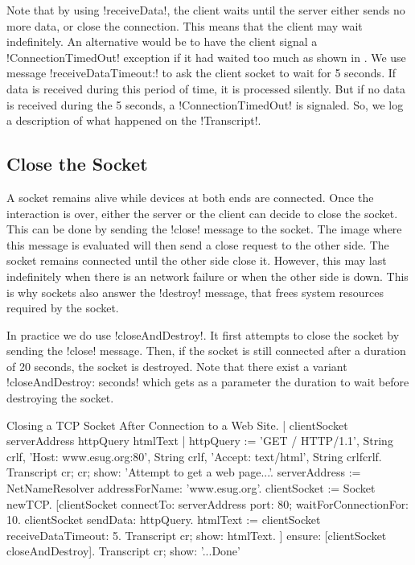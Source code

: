 \documentclass[a4paper,10pt,twoside]{book}
\begin{document}
Note that by using  \ct!receiveData!, the client waits until the server either sends no more data, or close the connection.
This means that the client may wait indefinitely.
An alternative would be to have the client signal a \ct!ConnectionTimedOut! exception if it had waited too much as shown in .
We use message \ct!receiveDataTimeout:! to ask the client socket to wait for 5 seconds.
If data is received during this period of time, it is processed silently.
But if no data is received during the 5 seconds, a \ct!ConnectionTimedOut! is signaled.
So, we log a description of what happened on the \ct!Transcript!.

\subsection{Close the Socket}
A socket remains alive while devices at both ends are connected.
Once the interaction is over, either the server or the client can decide to close the socket.
This can be done by sending the \ct!close! message to the socket.
The image where this message is evaluated will then send a close request to the other side.
The socket remains connected until the other side close it.
However, this may last indefinitely when there is an network failure or when the other side is down.
This is why sockets also answer the \ct!destroy! message, that frees system resources required by the socket.

In practice we do use \ct!closeAndDestroy!.
It first attempts to close the socket by sending the \ct!close! message.
Then, if the socket is still connected after a duration of 20 seconds, the socket is destroyed.
Note that there exist a variant \ct!closeAndDestroy: seconds! which gets as a parameter the duration to wait before destroying the socket.

\begin{script}[closeAndDestroy]{Closing a TCP Socket After Connection to a Web Site.}
| clientSocket serverAddress httpQuery htmlText |
httpQuery := 'GET / HTTP/1.1', String crlf, 
	'Host: www.esug.org:80', String crlf, 
	'Accept: text/html', String crlfcrlf.
Transcript cr; cr; show: 'Attempt to get a web page...'.
serverAddress := NetNameResolver addressForName: 'www.esug.org'.
clientSocket := Socket newTCP.
[clientSocket 
	connectTo: serverAddress port: 80;
	waitForConnectionFor: 10.
 clientSocket sendData: httpQuery.
 htmlText  := clientSocket receiveDataTimeout: 5.
 Transcript cr; show: htmlText.
] ensure: [clientSocket closeAndDestroy].
Transcript cr; show: '...Done'
\end{script}
\end{document}
